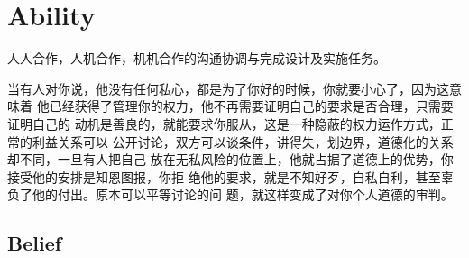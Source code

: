 \documentclass{book}
\begin{document}
\tableofcontents
\clearpage

\chapter{Ability}

人人合作，人机合作，机机合作的沟通协调与完成设计及实施任务。

当有人对你说，他没有任何私心，都是为了你好的时候，你就要小心了，因为这意味着
他已经获得了管理你的权力，他不再需要证明自己的要求是否合理，只需要证明自己的
动机是善良的，就能要求你服从，这是一种隐蔽的权力运作方式，正常的利益关系可以
公开讨论，双方可以谈条件，讲得失，划边界，道德化的关系却不同，一旦有人把自己
放在无私风险的位置上，他就占据了道德上的优势，你接受他的安排是知恩图报，你拒
绝他的要求，就是不知好歹，自私自利，甚至辜负了他的付出。原本可以平等讨论的问
题，就这样变成了对你个人道德的审判。

\section{Belief}
\end{document}
